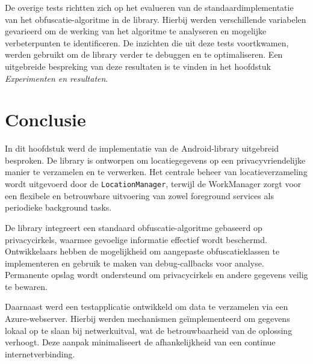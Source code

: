 De overige tests richtten zich op het evalueren van de standaardimplementatie van het obfuscatie-algoritme in de library. Hierbij werden verschillende variabelen gevarieerd om de werking van het algoritme te analyseren en mogelijke verbeterpunten te identificeren. De inzichten die uit deze tests voortkwamen, werden gebruikt om de library verder te debuggen en te optimaliseren. Een uitgebreide bespreking van deze resultaten is te vinden in het hoofdstuk \textit{Experimenten en resultaten}.

\section{Conclusie}
In dit hoofdstuk werd de implementatie van de Android-library uitgebreid besproken. De library is ontworpen om locatiegegevens op een privacyvriendelijke manier te verzamelen en te verwerken. Het centrale beheer van locatieverzameling wordt uitgevoerd door de \texttt{LocationManager}, terwijl de WorkManager zorgt voor een flexibele en betrouwbare uitvoering van zowel foreground services als periodieke background tasks.

De library integreert een standaard obfuscatie-algoritme gebaseerd op privacycirkels, waarmee gevoelige informatie effectief wordt beschermd. Ontwikkelaars hebben de mogelijkheid om aangepaste obfuscatieklassen te implementeren en gebruik te maken van debug-callbacks voor analyse. Permanente opslag wordt ondersteund om privacycirkels en andere gegevens veilig te bewaren.

Daarnaast werd een testapplicatie ontwikkeld om data te verzamelen via een Azure-webserver. Hierbij werden mechanismen geïmplementeerd om gegevens lokaal op te slaan bij netwerkuitval, wat de betrouwbaarheid van de oplossing verhoogt. Deze aanpak minimaliseert de afhankelijkheid van een continue internetverbinding.

